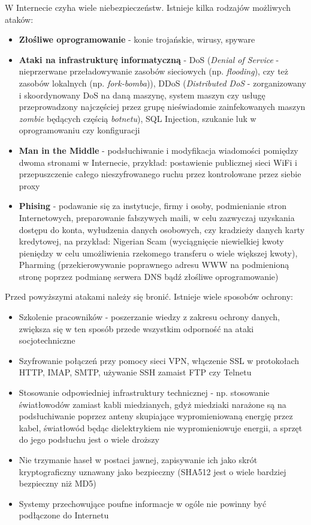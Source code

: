W Internecie czyha wiele niebezpieczeństw. Istnieje kilka rodzajów możliwych ataków:
\begin{itemize}
	\item \textbf{Złośliwe oprogramowanie} - konie trojańskie, wirusy, spyware
    \item \textbf{Ataki na infrastrukturę informatyczną} - DoS (\textit{Denial of Service} - nieprzerwane przeładowywanie zasobów sieciowych (np. \textit{flooding}), czy też zasobów lokalnych (np. \textit{fork-bomba})), DDoS (\textit{Distributed DoS} - zorganizowany i skoordynowany DoS na daną maszynę, system maszyn czy usługę przeprowadzony najczęściej przez grupę nieświadomie zainfekowanych maszyn \textit{zombie} będących częścią \textit{botnetu}), SQL Injection, szukanie luk w oprogramowaniu czy konfiguracji
    \item \textbf{Man in the Middle} - podsłuchiwanie i modyfikacja wiadomości pomiędzy dwoma stronami w Internecie, przykład: postawienie publicznej sieci WiFi i przepuszczenie całego nieszyfrowanego ruchu przez kontrolowane przez siebie proxy
    \item \textbf{Phising} - podawanie się za instytucje, firmy i osoby, podmienianie stron Internetowych, preparowanie fałszywych maili, w celu zazwyczaj uzyskania dostępu do konta, wyłudzenia danych osobowych, czy kradzieży danych karty kredytowej, na przykład: Nigerian Scam (wyciągnięcie niewielkiej kwoty pieniędzy w celu umożliwienia rzekomego transferu o wiele większej kwoty), Pharming (przekierowywanie poprawnego adresu WWW na podmienioną stronę poprzez podmianę serwera DNS bądź złośliwe oprogramowanie)
\end{itemize}

Przed powyższymi atakami należy się bronić. Istnieje wiele sposobów ochrony:
\begin{itemize}
	\item Szkolenie pracowników - poszerzanie wiedzy z zakresu ochrony danych, zwiększa się w ten sposób przede wszystkim odporność na ataki socjotechniczne
    \item Szyfrowanie połączeń przy pomocy sieci VPN, włączenie SSL w protokołach HTTP, IMAP, SMTP, używanie SSH zamaist FTP czy Telnetu
    \item Stosowanie odpowiedniej infrastruktury technicznej - np. stosowanie światłowodów zamiast kabli miedzianych, gdyż miedziaki narażone są na podsłuchiwanie poprzez anteny skupiające wypromieniowaną energię przez kabel, światłowód będąc dielektrykiem nie wypromieniowuje energii, a sprzęt do jego podsłuchu jest o wiele droższy
    \item Nie trzymanie haseł w postaci jawnej, zapisywanie ich jako skrót kryptograficzny uznawany jako bezpieczny (SHA512 jest o wiele bardziej bezpieczny niż MD5)
    \item Systemy przechowujące poufne informacje w ogóle nie powinny być podłączone do Internetu
\end{itemize}

